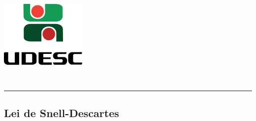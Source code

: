 \thispagestyle{empty}
\begin{center}
	\begin{minipage}[!]{\linewidth}
        \begin{minipage}[!]{.19\linewidth}
            \includegraphics[width=\linewidth]{img/logo.png}           
        \end{minipage}
        \begin{minipage}[!]{.8\linewidth}
            \center
            \ABNTEXchapterfont\normalsize\MakeUppercase{\imprimirinstituicao}
            \par
            \vspace*{10pt}                     
            \ABNTEXchapterfont\normalsize\MakeUppercase{\centro}
            \par
            \vspace*{10pt}           
            \ABNTEXchapterfont\normalsize\MakeUppercase{\disciplina}
        \end{minipage}        
    \end{minipage}
    \\ \vspace{0.5cm}
    \rule{\textwidth}{.5pt}   
\end{center}
    \textual
    \begin{center}
      \section{Lei de Snell-Descartes}
      \par
    \end{center}
    
